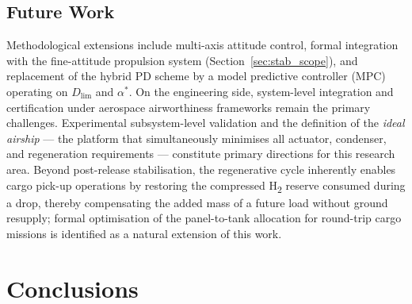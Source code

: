 \documentclass[applsci,article,submit,pdftex,moreauthors]{Definitions/mdpi}
\newcommand{\addedR}[1]{\textcolor{green!60!black}{#1}}
\begin{document}
\subsection{Future Work}
\addedR{Methodological extensions include multi-axis attitude control, formal integration with the fine-attitude propulsion system (Section~\ref{sec:stab_scope}), and replacement of the hybrid PD scheme by a model predictive controller (MPC) operating on $D_\text{lim}$ and $\alpha^*$. On the engineering side, system-level integration and certification under aerospace airworthiness frameworks remain the primary challenges. Experimental subsystem-level validation and the definition of the \emph{ideal airship} --- the platform that simultaneously minimises all actuator, condenser, and regeneration requirements --- constitute primary directions for this research area. Beyond post-release stabilisation, the regenerative cycle inherently enables cargo pick-up operations by restoring the compressed H\textsubscript{2} reserve consumed during a drop, thereby compensating the added mass of a future load without ground resupply; formal optimisation of the panel-to-tank allocation for round-trip cargo missions is identified as a natural extension of this work.}

\section{Conclusions}
\end{document}
